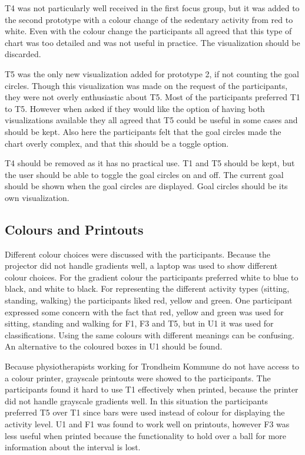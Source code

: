 T4 was not particularly well received in the first focus group, but it was added to the second prototype with a colour change of the sedentary activity from red to white. Even with the colour change the participants all agreed that this type of chart was too detailed and was not useful in practice. The visualization should be discarded.

T5 was the only new visualization added for prototype 2, if not counting the goal circles. Though this visualization was made on the request of the participants, they were not overly enthusiastic about T5. Most of the participants preferred T1 to T5. However when asked if they would like the option of having both visualizations available they all agreed that T5 could be useful in some cases and should be kept. Also here the participants felt that the goal circles made the chart overly complex, and that this should be a toggle option.

T4 should be removed as it has no practical use. T1 and T5 should be kept, but the user should be able to toggle the goal circles on and off. The current goal should be shown when the goal circles are displayed. Goal circles should be its own visualization.

\subsection{Colours and Printouts}
Different colour choices were discussed with the participants. Because the projector did not handle gradients well, a laptop was used to show different colour choices. For the gradient colour the participants preferred white to blue to black, and white to black. For representing the different activity types (sitting, standing, walking) the participants liked red, yellow and green. One participant expressed some concern with the fact that red, yellow and green was used for sitting, standing and walking for F1, F3 and T5, but in U1 it was used for classifications. Using the same colours with different meanings can be confusing. An alternative to the coloured boxes in U1 should be found.

Because physiotherapists working for Trondheim Kommune do not have access to a colour printer, grayscale printouts were showed to the participants. The participants found it hard to use T1 effectively when printed, because the printer did not handle grayscale gradients well. In this situation the participants preferred T5 over T1 since bars were used instead of colour for displaying the activity level. U1 and F1 was found to work well on printouts, however F3 was less useful when printed because the functionality to hold over a ball for more information about the interval is lost.

